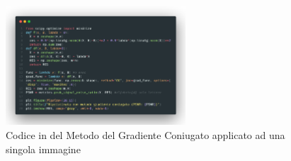 \begin{figure}[H]
  \centering
    \includegraphics[width=0.6\textwidth]{imgCode/metGradCon.png}
    \caption{Codice in  del Metodo del Gradiente Coniugato applicato ad una singola immagine}
    \label{fig:codeMGC}
\end{figure}

